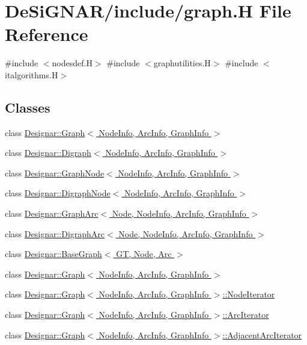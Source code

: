 \hypertarget{graph_8_h}{}\section{De\+Si\+G\+N\+A\+R/include/graph.H File Reference}
\label{graph_8_h}
{\ttfamily \#include $<$nodesdef.\+H$>$}\newline
{\ttfamily \#include $<$graphutilities.\+H$>$}\newline
{\ttfamily \#include $<$italgorithms.\+H$>$}\newline
\subsection*{Classes}
\begin{DoxyCompactItemize}
\item 
class \hyperlink{class_designar_1_1_graph}{Designar\+::\+Graph$<$ Node\+Info, Arc\+Info, Graph\+Info $>$}
\item 
class \hyperlink{class_designar_1_1_digraph}{Designar\+::\+Digraph$<$ Node\+Info, Arc\+Info, Graph\+Info $>$}
\item 
class \hyperlink{class_designar_1_1_graph_node}{Designar\+::\+Graph\+Node$<$ Node\+Info, Arc\+Info, Graph\+Info $>$}
\item 
class \hyperlink{class_designar_1_1_digraph_node}{Designar\+::\+Digraph\+Node$<$ Node\+Info, Arc\+Info, Graph\+Info $>$}
\item 
class \hyperlink{class_designar_1_1_graph_arc}{Designar\+::\+Graph\+Arc$<$ Node, Node\+Info, Arc\+Info, Graph\+Info $>$}
\item 
class \hyperlink{class_designar_1_1_digraph_arc}{Designar\+::\+Digraph\+Arc$<$ Node, Node\+Info, Arc\+Info, Graph\+Info $>$}
\item 
class \hyperlink{class_designar_1_1_base_graph}{Designar\+::\+Base\+Graph$<$ G\+T, Node, Arc $>$}
\item 
class \hyperlink{class_designar_1_1_graph}{Designar\+::\+Graph$<$ Node\+Info, Arc\+Info, Graph\+Info $>$}
\item 
class \hyperlink{class_designar_1_1_graph_1_1_node_iterator}{Designar\+::\+Graph$<$ Node\+Info, Arc\+Info, Graph\+Info $>$\+::\+Node\+Iterator}
\item 
class \hyperlink{class_designar_1_1_graph_1_1_arc_iterator}{Designar\+::\+Graph$<$ Node\+Info, Arc\+Info, Graph\+Info $>$\+::\+Arc\+Iterator}
\item 
class \hyperlink{class_designar_1_1_graph_1_1_adjacent_arc_iterator}{Designar\+::\+Graph$<$ Node\+Info, Arc\+Info, Graph\+Info $>$\+::\+Adjacent\+Arc\+Iterator}

\end{DoxyCompactItemize}
